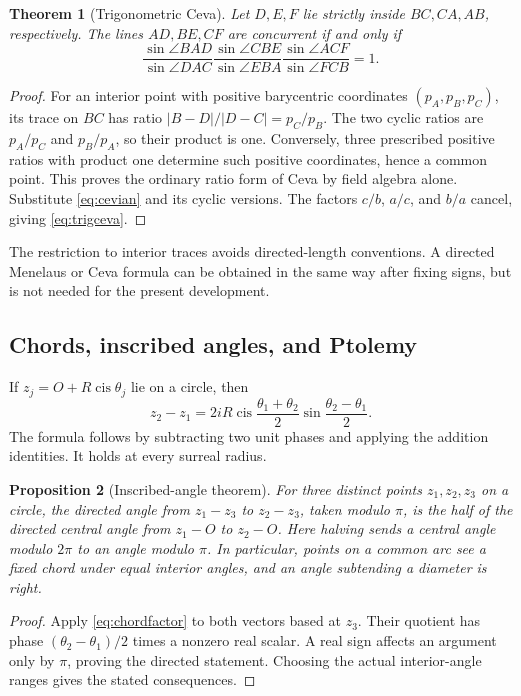 \documentclass[11pt]{article}
\numberwithin{equation}{section}
\newtheorem{theorem}{Theorem}[section]
\newtheorem{proposition}[theorem]{Proposition}
\theoremstyle{definition}
\newcommand{\cis}{\operatorname{cis}}
\begin{document}
\begin{theorem}[Trigonometric Ceva]\label{thm:ceva}
Let $D,E,F$ lie strictly inside $BC,CA,AB$, respectively. The lines $AD,BE,CF$ are concurrent if and only if
\begin{equation}\label{eq:trigceva}
 \frac{\sin\angle BAD}{\sin\angle DAC}
 \frac{\sin\angle CBE}{\sin\angle EBA}
 \frac{\sin\angle ACF}{\sin\angle FCB}=1.
\end{equation}
\end{theorem}
\begin{proof}
For an interior point with positive barycentric coordinates $(p_A,p_B,p_C)$, its trace on $BC$ has ratio $|B-D|/|D-C|=p_C/p_B$. The two cyclic ratios are $p_A/p_C$ and $p_B/p_A$, so their product is one. Conversely, three prescribed positive ratios with product one determine such positive coordinates, hence a common point. This proves the ordinary ratio form of Ceva by field algebra alone. Substitute \eqref{eq:cevian} and its cyclic versions. The factors $c/b$, $a/c$, and $b/a$ cancel, giving \eqref{eq:trigceva}.
\end{proof}
The restriction to interior traces avoids directed-length conventions. A directed Menelaus or Ceva formula can be obtained in the same way after fixing signs, but is not needed for the present development.

\subsection{Chords, inscribed angles, and Ptolemy}
If $z_j=O+R\cis\theta_j$ lie on a circle, then
\begin{equation}\label{eq:chordfactor}
 z_2-z_1=2iR\cis\frac{\theta_1+\theta_2}{2}
                 \sin\frac{\theta_2-\theta_1}{2}.
\end{equation}
The formula follows by subtracting two unit phases and applying the addition identities. It holds at every surreal radius.

\begin{proposition}[Inscribed-angle theorem]\label{prop:inscribed}
For three distinct points $z_1,z_2,z_3$ on a circle, the directed angle from $z_1-z_3$ to $z_2-z_3$, taken modulo $\pi$, is the half of the directed central angle from $z_1-O$ to $z_2-O$. Here halving sends a central angle modulo $2\pi$ to an angle modulo $\pi$. In particular, points on a common arc see a fixed chord under equal interior angles, and an angle subtending a diameter is right.
\end{proposition}
\begin{proof}
Apply \eqref{eq:chordfactor} to both vectors based at $z_3$. Their quotient has phase $(\theta_2-\theta_1)/2$ times a nonzero real scalar. A real sign affects an argument only by $\pi$, proving the directed statement. Choosing the actual interior-angle ranges gives the stated consequences.
\end{proof}
\end{document}
